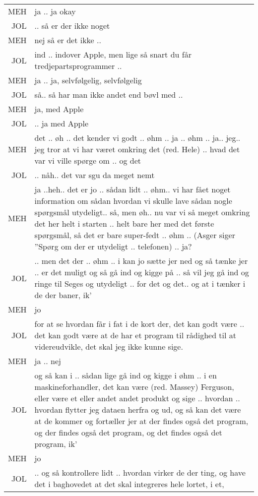 \begin{longtable}{ r | p{13.5cm} }
    MEH & ja .. ja okay \\
    JOL & .. så er der ikke noget \\
    MEH & nej så er det ikke .. \\
    JOL & ind .. indover Apple, men lige så snart du får tredjepartsprogrammer .. \\
    MEH & ja .. ja, selvfølgelig, selvfølgelig \\
    JOL & så.. så har man ikke andet end bøvl med .. \\
    MEH & ja, med Apple \\
    JOL & .. ja med Apple \\
    MEH & det .. øh .. det kender vi godt .. øhm .. ja .. øhm .. ja.. jeg.. jeg tror at vi har været omkring det (red. Hele) .. hvad det var vi ville spørge om .. og det  \\
    JOL & .. nåh.. det var sgu da meget nemt  \\
    MEH & ja ..heh.. det er jo .. sådan lidt .. øhm.. vi har fået noget information om sådan hvordan vi skulle lave sådan nogle spørgsmål {utydeligt}.. så, men øh.. nu var vi så meget omkring det her helt i starten .. helt bare her med det første spørgsmål, så det er bare super-fedt .. øhm .. (Asger siger ”Spørg om der er {utydeligt} .. telefonen) .. ja? \\
    JOL & .. men det der .. øhm .. i kan jo sætte jer ned og så tænke jer .. er det muligt og så gå ind og kigge på .. så vil jeg gå ind og ringe til Seges og {utydeligt} .. for det og det.. og at i tænker i de der baner, ik’ \\
    MEH & jo \\
    JOL & for at se hvordan får i fat i de kort der, det kan godt være .. det kan godt være at de har et program til rådighed til at videreudvikle, det skal jeg ikke kunne sige. \\
    MEH & ja .. nej \\
    JOL & og så kan i .. sådan lige gå ind og kigge i øhm .. i en maskineforhandler, det kan være (red. Massey) Ferguson, eller være et eller andet andet produkt og sige .. hvordan .. hvordan flytter jeg dataen herfra og ud, og så kan det være at de kommer og fortæller jer at der findes også det program, og der findes også det program, og det findes også det program, ik’ \\
    MEH & jo \\
    JOL & .. og så kontrollere lidt .. hvordan virker de der ting, og have det i baghovedet at det skal integreres hele lortet, i et, \\

\end{longtable}
